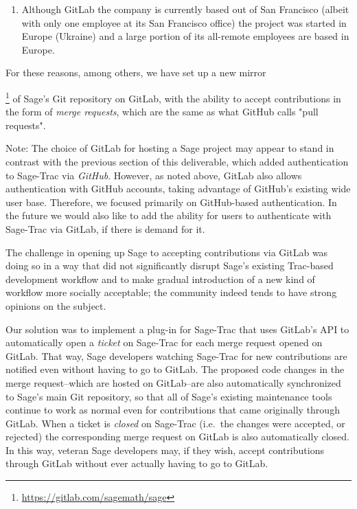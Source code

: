 \begin{enumerate}
\item Although GitLab the company is currently based out of San Francisco
    (albeit with only one employee at its San Francisco office) the project
    was started in Europe (Ukraine) and a large portion of its all-remote
    employees are based in Europe.
\end{enumerate}

For these reasons, among others, we have set up a new
mirror{\footnote{\url{https://gitlab.com/sagemath/sage}} of Sage's Git
repository on GitLab, with the ability to accept contributions in the form of
{\em merge requests}, which are the same as what GitHub calls "pull requests".

Note: The choice of GitLab for hosting a Sage project may appear to stand in
contrast with the previous section of this deliverable, which added
authentication to Sage-Trac via {\em GitHub}.  However, as noted above, GitLab
also allows authentication with GitHub accounts, taking advantage of GitHub's
existing wide user base.  Therefore, we focused primarily on GitHub-based
authentication.  In the future we would also like to add the ability for users
to authenticate with Sage-Trac via GitLab, if there is demand for it.

The challenge in opening up Sage to accepting contributions via GitLab was
doing so in a way that did not significantly disrupt Sage's existing Trac-based
development workflow and to make gradual introduction of a new kind of workflow
more socially acceptable; the community indeed tends to have strong opinions on
the subject.

Our solution was to implement a plug-in for Sage-Trac that uses GitLab's API to
automatically open a {\em ticket} on Sage-Trac for each merge request opened on
GitLab.  That way, Sage developers watching Sage-Trac for new contributions are
notified even without having to go to GitLab.  The proposed code changes in the
merge request--which are hosted on GitLab--are also automatically synchronized
to Sage's main Git repository, so that all of Sage's existing maintenance tools
continue to work as normal even for contributions that came originally through
GitLab.  When a ticket is {\em closed} on Sage-Trac (i.e.~the changes were
accepted, or rejected) the corresponding merge request on GitLab is also
automatically closed.  In this way, veteran Sage developers may, if they wish,
accept contributions through GitLab without ever actually having to go to
GitLab.

}
